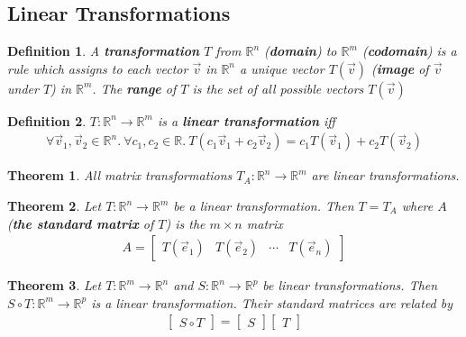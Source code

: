 \documentclass{article}
\theoremstyle{sltheorem}
\newtheorem{definition}{Definition}[section]
\newtheorem{theorem}{Theorem}[section]
\begin{document}
\subsection{Linear Transformations}
\begin{definition}
    A \textbf{transformation} $T$ from $\mathbb{R}^n$ (\textbf{domain}) to $\mathbb{R}^m$ (\textbf{codomain}) is a rule which assigns to each vector $\vec v$ in $\mathbb{R}^n$ a unique vector $T(\vec v)$ (\textbf{image} of $\vec v$ under $T$) in $\mathbb{R}^m$. 
    The \textbf{range} of $T$ is the set of all possible vectors $T(\vec v)$
\end{definition}
\begin{definition}
   $T:\mathbb{R}^n \to \mathbb{R}^m$ is a \textbf{linear transformation} iff
    \begin{align*}        
        \forall \vec v_1, \vec v_2 \in \mathbb{R}^n.\:\forall c_1, c_2 \in \mathbb{R}.\: T(c_1\vec v_1 + c_2\vec v_2) = c_1T(\vec v_1) + c_2T(\vec v_2)
    \end{align*}
\end{definition}
\begin{theorem}
    All matrix transformations $T_A:\mathbb{R}^n\to\mathbb{R}^m$ are linear transformations.
\end{theorem}
\begin{theorem}
    Let $T:\mathbb{R}^n\to\mathbb{R}^m$ be a linear transformation. Then $T=T_A$ where $A$ (\textbf{the standard matrix} of $T$) is the $m\times n$ matrix 
    \begin{align*}
        A = \begin{bmatrix}
            T(\vec e_1) & T(\vec e_2) & \cdots & T(\vec e_n)
        \end{bmatrix}
    \end{align*}
\end{theorem}
\begin{theorem}
    Let $T:\mathbb{R}^m\to\mathbb{R}^n$ and $S:\mathbb{R}^n\to\mathbb{R}^p$ be linear transformations. Then $S\circ T:\mathbb{R}^m\to\mathbb{R}^p$ is a linear transformation. Their standard matrices are related by
    \begin{align*}
        \begin{bmatrix}
            S\circ T
        \end{bmatrix}
        = \begin{bmatrix}
            S
        \end{bmatrix}
        \begin{bmatrix}
            T
        \end{bmatrix}
    \end{align*}
\end{theorem}
\end{document}
